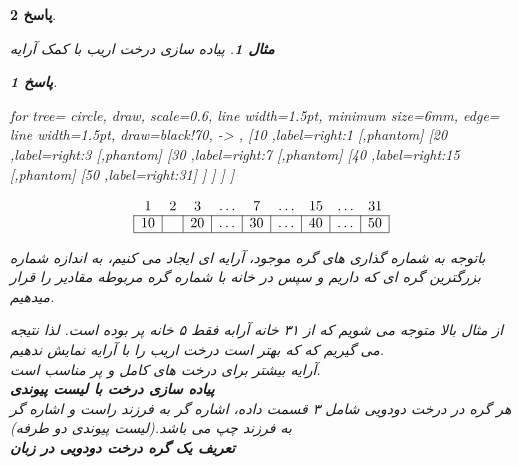 \documentclass[12pt]{article}
\newtheorem{question}{مثال}[section]
\newtheorem{answer}{پاسخ}[section]
\begin{document}
\begin{answer}
\begin{question}
پیاده سازی درخت اریب با کمک آرایه
\end{question}
\begin{answer}
\begin{latin}
	\begin{minipage}{0.4\textwidth}
		\centering
		\begin{forest}
			for tree={
				circle, draw,
				scale=0.6,
				line width=1.5pt,
				minimum size=6mm,
				edge={
					line width=1.5pt,
					draw=black!70,
					-> %
				},
}
[10 ,label=right:1
	[,phantom]
	[20 ,label=right:3
		[,phantom]
		[30 ,label=right:7
			[,phantom]
			[40 ,label=right:15
				[,phantom]
				[50 ,label=right:31]
			]
		]
	]
]
\end{forest}
\end{minipage}%
\hfill
\begin{minipage}{0.55\textwidth}
\[
	\begin{array}{*{9}{|c}|}
			\multicolumn{1}{c}{1} & \multicolumn{1}{c}{2} & 
			\multicolumn{1}{c}{3} & \multicolumn{1}{c}{\dots} & 
			\multicolumn{1}{c}{7} & \multicolumn{1}{c}{\dots} & \multicolumn{1}{c}{15} & \multicolumn{1}{c}{\dots}& \multicolumn{1}{c}{31} \\
			
	\cline{1-9}
	10 &  & 20 & \dots & 30 & \dots & 40 & \dots & 50 \\
	\hline
	\end{array}
\]
\end{minipage}
\end{latin}

\newline
باتوجه به شماره گذاری های گره موجود، آرایه ای ایجاد می کنیم، به اندازه شماره بزرگترین گره ای که داریم و سپس در خانه با شماره گره مربوطه مقادیر را قرار میدهیم.\\
\end{answer}

از مثال بالا متوجه می شویم که از ۳۱ خانه آرابه فقط ۵ خانه پر بوده است. لذا نتیجه می گیریم که که بهتر است درخت اریب را با آرایه نمایش ندهیم.\\
آرایه بیشتر برای درخت های کامل و پر مناسب است.\\

\textbf{پیاده سازی درخت با لیست پیوندی }\\
هر گره در درخت دودویی شامل ۳ قسمت داده، اشاره گر به فرزند راست و اشاره گر به فرزند چپ می باشد.(لیست پیوندی دو طرفه)\\
\newline
\textbf{تعریف یک گره درخت دودویی در زبان }\\



\end{answer}
\end{document}
